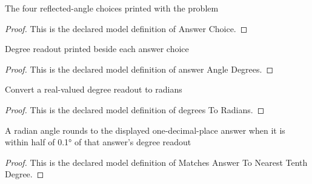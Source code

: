 \begin{definition}
  \label{def:physics:phyx-mini-0037:phyxminiproblems-problemphyxmini0037-answerchoice}
  The four reflected-angle choices printed with the problem
\end{definition}
\begin{proof}
  This is the declared model definition of Answer Choice.
\end{proof}
\begin{definition}
  \label{def:physics:phyx-mini-0037:phyxminiproblems-problemphyxmini0037-answerangledegrees}
  Degree readout printed beside each answer choice
\end{definition}
\begin{proof}
  This is the declared model definition of answer Angle Degrees.
\end{proof}
\begin{definition}
  \label{def:physics:phyx-mini-0037:phyxminiproblems-problemphyxmini0037-degreestoradians}
  Convert a real-valued degree readout to radians
\end{definition}
\begin{proof}
  This is the declared model definition of degrees To Radians.
\end{proof}
\begin{definition}
  \label{def:physics:phyx-mini-0037:phyxminiproblems-problemphyxmini0037-matchesanswertonearesttenthdegree}
  A radian angle rounds to the displayed one-decimal-place answer when it is within half of 0.1° of that answer's degree readout
\end{definition}
\begin{proof}
  This is the declared model definition of Matches Answer To Nearest Tenth Degree.
\end{proof}
